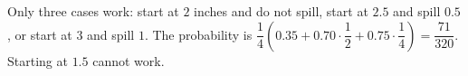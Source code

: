 Only three cases work: start at $2$ inches and do not spill, start at $2.5$ and spill $0.5$, or start at $3$ and spill $1$. The probability is $\dfrac{1}{4}\left(0.35+0.70\cdot\dfrac{1}{2}+0.75\cdot\dfrac{1}{4}\right)=\boxed{\dfrac{71}{320}}$. Starting at $1.5$ cannot work.
